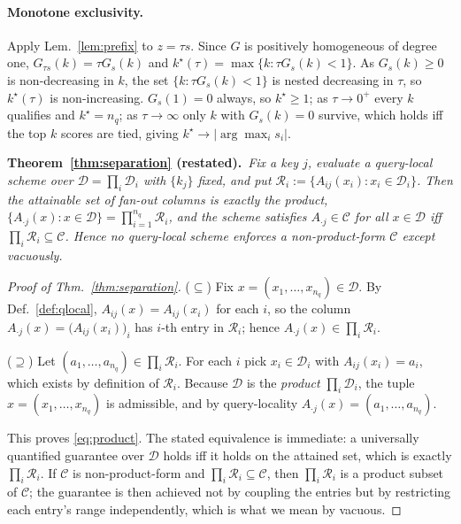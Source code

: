 \documentclass{article}
\begin{document}
\paragraph{Monotone exclusivity.} Apply Lem.~\ref{lem:prefix} to $z = \tau s$. Since $G$ is
positively homogeneous of degree one, $G_{\tau s}(k) = \tau G_s(k)$ and
$k^\star(\tau) = \max\{k : \tau G_s(k) < 1\}$. As $G_s(k)\ge0$ is non-decreasing in $k$, the set
$\{k : \tau G_s(k) < 1\}$ is nested decreasing in $\tau$, so $k^\star(\tau)$ is non-increasing.
$G_s(1)=0$ always, so $k^\star\ge1$; as $\tau\to0^+$ every $k$ qualifies and $k^\star=n_q$; as
$\tau\to\infty$ only $k$ with $G_s(k)=0$ survive, which holds iff the top $k$ scores are tied,
giving $k^\star\to|\arg\max_i s_i|$.

\medskip\noindent\textbf{Theorem~\ref{thm:separation} (restated).}\ \emph{Fix a key $j$, evaluate a query-local scheme over $\mathcal{D}=\prod_i\mathcal{D}_i$ with
$\{k_j\}$ fixed, and put $\mathcal{R}_i := \{A_{ij}(x_i) : x_i\in\mathcal{D}_i\}$. Then the
attainable set of fan-out columns is exactly the product,
$\{A_{\cdot j}(x) : x\in\mathcal{D}\} = \prod_{i=1}^{n_q}\mathcal{R}_i$, and the scheme satisfies
$A_{\cdot j}\in\mathcal{C}$ for all $x\in\mathcal{D}$ iff $\prod_i\mathcal{R}_i\subseteq\mathcal{C}$.
Hence no query-local scheme enforces a non-product-form $\mathcal{C}$ except vacuously.}

\begin{proof}[Proof of Thm.~\ref{thm:separation}]
($\subseteq$) Fix $x = (x_1,\dots,x_{n_q}) \in \mathcal{D}$. By Def.~\ref{def:qlocal},
$A_{ij}(x) = A_{ij}(x_i)$ for each $i$, so the column
$A_{\cdot j}(x) = \big(A_{ij}(x_i)\big)_{i}$ has $i$-th entry in $\mathcal{R}_i$; hence
$A_{\cdot j}(x) \in \prod_i \mathcal{R}_i$.

($\supseteq$) Let $(a_1,\dots,a_{n_q}) \in \prod_i \mathcal{R}_i$. For each $i$ pick
$x_i \in \mathcal{D}_i$ with $A_{ij}(x_i) = a_i$, which exists by definition of $\mathcal{R}_i$. Because
$\mathcal{D}$ is the \emph{product} $\prod_i \mathcal{D}_i$, the tuple
$x = (x_1,\dots,x_{n_q})$ is admissible, and by query-locality
$A_{\cdot j}(x) = (a_1,\dots,a_{n_q})$.

This proves \eqref{eq:product}. The stated equivalence is immediate: a universally quantified
guarantee over $\mathcal{D}$ holds iff it holds on the attained set, which is exactly
$\prod_i \mathcal{R}_i$. If $\mathcal{C}$ is non-product-form and $\prod_i \mathcal{R}_i \subseteq \mathcal{C}$, then
$\prod_i \mathcal{R}_i$ is a product subset of $\mathcal{C}$; the guarantee is then achieved not by
coupling the entries but by restricting each entry's range independently, which is what we
mean by vacuous.
\end{proof}
\end{document}
